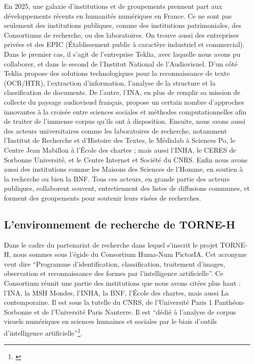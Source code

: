 En 2025, une galaxie d'institutions et de groupements prennent part aux développements récents en humanités numériques en France. Ce ne sont pas seulement des institutions publiques, comme des institutions patrimoniales, des Consortiums de recherche, ou des laboratoires. On trouve aussi des entreprises privées et des EPIC (Établissement public à caractère industriel et commercial). Dans le premier cas, il s'agit de l'entreprise Teklia, avec laquelle nous avons pu collaborer, et dans le second de l'Institut National de l'Audiovisuel. D'un côté Teklia propose des solutions technologiques pour la reconnaissance de texte (OCR/HTR), l'extraction d'information, l'analyse de la structure et la classification de documents. De l'autre, l'INA, en plus de remplir sa mission de collecte du paysage audiovisuel français, propose un certain nombre d'approches innovantes à la croisée entre sciences sociales et méthodes computationnelles afin de traiter de l'immense corpus qu'ils ont à disposition. Ensuite, nous avons aussi des acteurs universitaires comme les laboratoires de recherche, notamment l'Institut de Recherche et d'Histoire des Textes, le Médialab à Sciences Po, le Centre Jean Mabillon à l'École des chartes ; mais aussi l'INHA, le CERES de Sorbonne Université, et le Centre Internet et Société du CNRS. Enfin nous avons aussi des institutions comme les Maisons des Sciences de l'Homme, en soutien à la recherche ou bien la BNF. Tous ces acteurs, en grande partie des acteurs publiques, collaborent souvent, entretiennent des listes de diffusions communes, et forment des groupements pour soutenir leurs visées de recherches.

\subsection{L'environnement de recherche de TORNE-H}

Dans le cadre du partenariat de recherche dans lequel s'inscrit le projet TORNE-H, nous sommes sous l'égide du Consortium Huma-Num PictorIA. Cet acronyme veut dire \enquote{Programme d'identification, classification, traitement d'images, observation et reconnaissance des formes par l'intelligence artificielle}. Ce Consortium réunit une partie des institutions que nous avons citées plus haut : l'INA, la MSH Mondes, l'INHA, la BNF, l'École des chartes, mais aussi La contemporaine. Il est sous la tutelle du CNRS, de l'Université Paris 1 Panthéon-Sorbonne et de l'Université Paris Nanterre. Il est \enquote{dédié à l’analyse de corpus visuels numériques en sciences humaines et sociales par le biais d’outils d’intelligence artificielle}\footnote{\cite{noauthor_pictoria_nodate}}.

